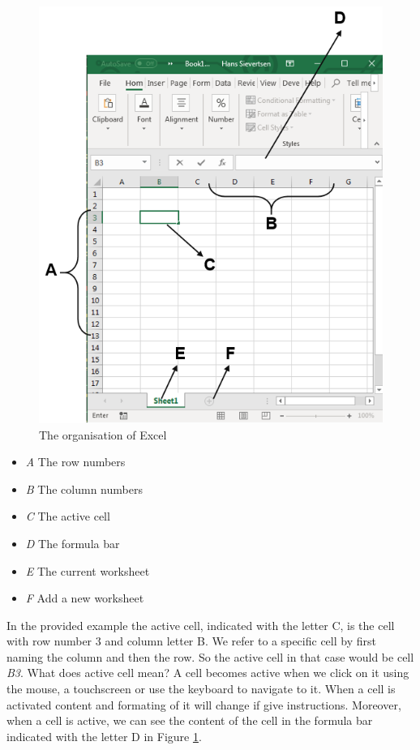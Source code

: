 \documentclass[]{book}
\providecommand{\tightlist}{%
  \setlength{\itemsep}{0pt}\setlength{\parskip}{0pt}}
\begin{document}
\begin{figure}

{\centering \includegraphics[width=0.9\linewidth]{_resources/chapter_excelbasic/excelstructure} 

}

\caption{The organisation of Excel}\label{fig:ex1}
\end{figure}

\begin{itemize}
\tightlist
\item
  \emph{A} The row numbers
\item
  \emph{B} The column numbers
\item
  \emph{C} The active cell
\item
  \emph{D} The formula bar
\item
  \emph{E} The current worksheet
\item
  \emph{F} Add a new worksheet
\end{itemize}

In the provided example the active cell, indicated with the letter C, is the cell with row number 3 and column letter B. We refer to a specific cell by first naming the column and then the row. So the active cell in that case would be cell \emph{B3}. What does active cell mean? A cell becomes active when we click on it using the mouse, a touchscreen or use the keyboard to navigate to it. When a cell is activated content and formating of it will change if give instructions. Moreover, when a cell is active, we can see the content of the cell in the formula bar indicated with the letter D in Figure \ref{fig:ex1}.
\end{document}
